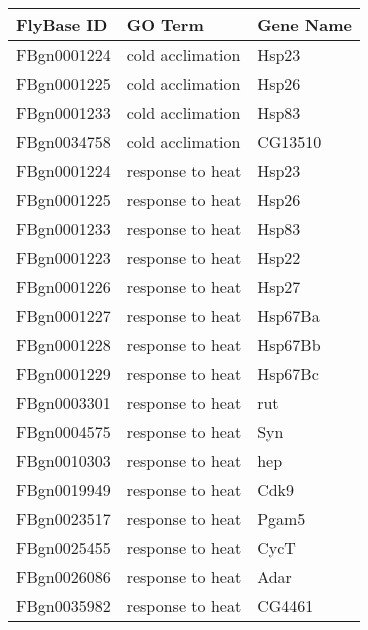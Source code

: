 \centering \begin{tabular}{l|l|l}
FlyBase ID	&GO Term	&Gene Name\\\hline
FBgn0001224	&cold acclimation	&Hsp23\\
FBgn0001225	&cold acclimation	&Hsp26\\
FBgn0001233	&cold acclimation	&Hsp83\\
FBgn0034758	&cold acclimation	&CG13510\\
FBgn0001224	&response to heat	&Hsp23\\
FBgn0001225	&response to heat	&Hsp26\\
FBgn0001233	&response to heat	&Hsp83\\
FBgn0001223	&response to heat	&Hsp22\\
FBgn0001226	&response to heat	&Hsp27\\
FBgn0001227	&response to heat	&Hsp67Ba\\
FBgn0001228	&response to heat	&Hsp67Bb\\
FBgn0001229	&response to heat	&Hsp67Bc\\
FBgn0003301	&response to heat	&rut\\
FBgn0004575	&response to heat	&Syn\\
FBgn0010303	&response to heat	&hep\\
FBgn0019949	&response to heat	&Cdk9\\
FBgn0023517	&response to heat	&Pgam5\\
FBgn0025455	&response to heat	&CycT\\
FBgn0026086	&response to heat	&Adar\\
FBgn0035982	&response to heat	&CG4461\\
\end{tabular}
